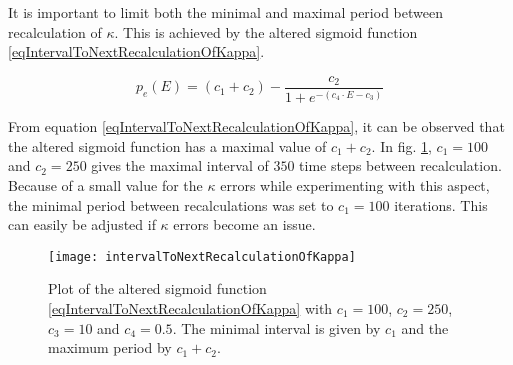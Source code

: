 	It is important to limit both the minimal and maximal period between recalculation of $\kappa$.
	This is achieved by the altered sigmoid function \eqref{eqIntervalToNextRecalculationOfKappa}. %
	
\begin{equation}
	p_e(E) = (c_1 + c_2) - \frac{c_2}{1+e^{-(c_4\cdot E - c_3)}}
	\label{eqIntervalToNextRecalculationOfKappa}
\end{equation}

	From equation \eqref{eqIntervalToNextRecalculationOfKappa}, it can be observed that the altered sigmoid function has a maximal value of $c_1+c_2$.
	In fig. \ref{figIntervalToNextRecalculationOfKappa}, $c_1=100$ and $c_2=250$ gives the maximal interval of $350$ time steps between recalculation.
	Because of a small value for the $\kappa$ errors while experimenting with this aspect, the minimal period between recalculations was set to $c_1 = 100$ iterations.
	This can easily be adjusted if $\kappa$ errors become an issue.
	 

\begin{figure}[bhtp]
	\centering
	\texttt{[image: intervalToNextRecalculationOfKappa]}
	\caption[Plot of the altered sigmoid function \eqref{eqIntervalToNextRecalculationOfKappa}, used for determination of the interval to the next recalculation of $\kappa$ in a $\kappa M$ node]{
			Plot of the altered sigmoid function \eqref{eqIntervalToNextRecalculationOfKappa} with $c_1=100$, $c_2=250$, $c_3=10$ and $c_4=0.5$.
			The minimal interval is given by $c_1$ and the maximum period by $c_1+c_2$.  }
	\label{figIntervalToNextRecalculationOfKappa}
\end{figure}


